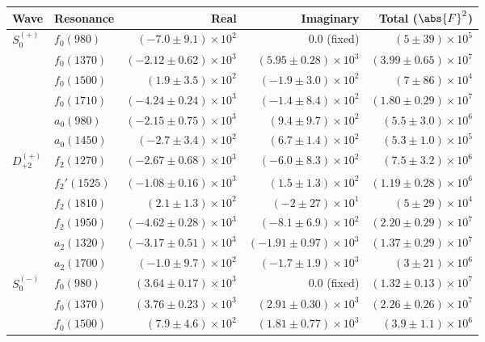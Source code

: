 \begin{table}[ht]
    \begin{center}
        \begin{tabular}{llrrr}\toprule
        Wave & Resonance & Real & Imaginary & Total ($\abs{F}^2$) \\\midrule
$S_{0}^{(+)}$ & $f_{0}(980)$ & $(-7.0 \pm 9.1) \times 10^{2}$ & $0.0$ (fixed) & $(5 \pm 39) \times 10^{5}$ \\
 & $f_{0}(1370)$ & $(-2.12 \pm 0.62) \times 10^{3}$ & $(5.95 \pm 0.28) \times 10^{3}$ & $(3.99 \pm 0.65) \times 10^{7}$ \\
 & $f_{0}(1500)$ & $(1.9 \pm 3.5) \times 10^{2}$ & $(-1.9 \pm 3.0) \times 10^{2}$ & $(7 \pm 86) \times 10^{4}$ \\
 & $f_{0}(1710)$ & $(-4.24 \pm 0.24) \times 10^{3}$ & $(-1.4 \pm 8.4) \times 10^{2}$ & $(1.80 \pm 0.29) \times 10^{7}$ \\
 & $a_{0}(980)$ & $(-2.15 \pm 0.75) \times 10^{3}$ & $(9.4 \pm 9.7) \times 10^{2}$ & $(5.5 \pm 3.0) \times 10^{6}$ \\
 & $a_{0}(1450)$ & $(-2.7 \pm 3.4) \times 10^{2}$ & $(6.7 \pm 1.4) \times 10^{2}$ & $(5.3 \pm 1.0) \times 10^{5}$ \\
$D_{+2}^{(+)}$ & $f_{2}(1270)$ & $(-2.67 \pm 0.68) \times 10^{3}$ & $(-6.0 \pm 8.3) \times 10^{2}$ & $(7.5 \pm 3.2) \times 10^{6}$ \\
 & $f_{2}'(1525)$ & $(-1.08 \pm 0.16) \times 10^{3}$ & $(1.5 \pm 1.3) \times 10^{2}$ & $(1.19 \pm 0.28) \times 10^{6}$ \\
 & $f_{2}(1810)$ & $(2.1 \pm 1.3) \times 10^{2}$ & $(-2 \pm 27) \times 10^{1}$ & $(5 \pm 29) \times 10^{4}$ \\
 & $f_{2}(1950)$ & $(-4.62 \pm 0.28) \times 10^{3}$ & $(-8.1 \pm 6.9) \times 10^{2}$ & $(2.20 \pm 0.29) \times 10^{7}$ \\
 & $a_{2}(1320)$ & $(-3.17 \pm 0.51) \times 10^{3}$ & $(-1.91 \pm 0.97) \times 10^{3}$ & $(1.37 \pm 0.29) \times 10^{7}$ \\
 & $a_{2}(1700)$ & $(-1.0 \pm 9.7) \times 10^{2}$ & $(-1.7 \pm 1.9) \times 10^{3}$ & $(3 \pm 21) \times 10^{6}$ \\
$S_{0}^{(-)}$ & $f_{0}(980)$ & $(3.64 \pm 0.17) \times 10^{3}$ & $0.0$ (fixed) & $(1.32 \pm 0.13) \times 10^{7}$ \\
 & $f_{0}(1370)$ & $(3.76 \pm 0.23) \times 10^{3}$ & $(2.91 \pm 0.30) \times 10^{3}$ & $(2.26 \pm 0.26) \times 10^{7}$ \\
 & $f_{0}(1500)$ & $(7.9 \pm 4.6) \times 10^{2}$ & $(1.81 \pm 0.77) \times 10^{3}$ & $(3.9 \pm 1.1) \times 10^{6}$ \\

\end{tabular}
\end{center}
\end{table}
